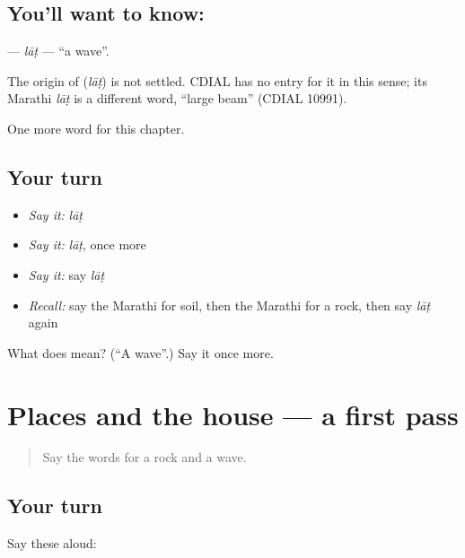 \subsection*{You'll want to know: }
\textbf{} — \emph{lāṭ} — \textquotedblleft{}a wave\textquotedblright{}.

\begin{cousinweb}
The origin of \textbf{} (\emph{lāṭ}) is not settled. CDIAL has no entry for it in this sense; its Marathi \emph{lāṭ} is a different word, \textquotedblleft{}large beam\textquotedblright{} (CDIAL 10991).
\end{cousinweb}

\begin{grammarlens}[title={What you've built}]
One more word for this chapter.
\end{grammarlens}

\subsection*{Your turn}
\begin{itemize}
\raggedright
  \item \emph{Say it:} \emph{lāṭ}
  \item \emph{Say it:} \emph{lāṭ}, once more
  \item \emph{Say it:} say \emph{lāṭ}
  \item \emph{Recall:} say the Marathi for soil, then the Marathi for a rock, then say \emph{lāṭ} again
\end{itemize}

\begin{tcolorbox}[breakable,colback=teal!4,colframe=teal!35!black,title={Before you move on}]
What does  mean? (\textquotedblleft{}A wave\textquotedblright{}.) Say it once more.
\end{tcolorbox}
\section[(dialogue)]{Places and the house — a first pass}

\label{lesson:MR-R140-first-pass-places-and-the-house}



\begin{quote}
Say the words for a rock and a wave.
\end{quote}

\subsection*{Your turn}
Say these aloud:

